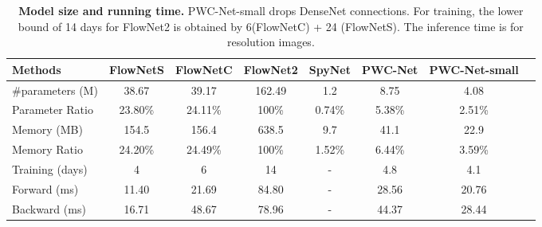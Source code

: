 \documentclass[10pt,journal,cspaper,compsoc]{IEEEtran}
\newcommand{\bd}[1]{\textbf{#1}}
\begin{document}
	\begin{table}[h]
		\caption{ \bd{Model size and running time.} PWC-Net-small drops DenseNet connections. For training, the lower bound of 14 days for FlowNet2 is obtained by 6(FlowNetC) + 24 (FlowNetS). The inference time is for  resolution images.}
		\label{tab:time:memory} \vspace{-1mm}
		\scriptsize
		\centering
		\setlength\tabcolsep{1pt} 
		\begin{tabular}{lccccccc} \\
			Methods & FlowNetS & FlowNetC & FlowNet2 & SpyNet  & PWC-Net & PWC-Net-small \\ \hline
			\#parameters (M) & 38.67 & 39.17 &  162.49&  1.2  &8.75 &  4.08  \\ 
			Parameter Ratio		& 23.80\%& 24.11\% &100\% & 0.74\% & 5.38\% & 2.51\% \\
			Memory (MB) & 154.5 & 156.4 & 638.5& 9.7  & 41.1  & 22.9 \\
			Memory Ratio &24.20\% &	24.49\% &	100\% &	1.52\%   &	6.44\% &	3.59\%\\ \hline
			Training (days) & 4  & 6 & 14 & -  &4.8 & 4.1 \\ Forward (ms) &11.40	&21.69	&84.80 & - 		&28.56 &20.76\\
			Backward (ms)	&16.71	&48.67	&78.96& -		&44.37 &28.44 \\
		\end{tabular}
	\end{table}
	
\end{document}
